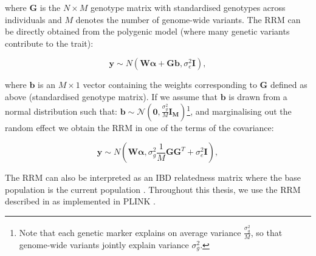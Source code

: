 where $\mathbf{G}$ is the $N \times M$ genotype matrix with standardised genotypes across individuals and $M$ denotes the number of genome-wide variants. 
The $\mathrm{RRM}$ can be directly obtained from the polygenic model (where many genetic variants contribute to the trait):

\begin{equation}\label{eq:polygenic_model}
    \mathbf{y} \sim N (\mathbf{W}\boldsymbol{\alpha} +  \mathbf{G}\mathbf{b}, \sigma_e^2\mathbf{I}),
\end{equation}

where $\mathbf{b}$ is an $M \times 1$ vector containing the weights corresponding to $\mathbf{G}$ defined as above (standardised genotype matrix).
If we assume that $\mathbf{b}$ is drawn from a normal distribution such that: $\mathbf{b} \sim \mathcal{N}(\mathbf{0}, \frac{\sigma_g^2}{M} \mathbf{I_M})$\footnote{Note that each genetic marker explains on average variance $\frac{\sigma_g^2}{M}$, so that genome-wide variants jointly explain variance $\sigma_g^2$.}, and marginalising out the random effect we obtain the RRM in one of the terms of the covariance:

\begin{equation}\label{eq:polygenic_model_MVN}
    \mathbf{y} \sim N (\mathbf{W}\boldsymbol{\alpha}, \sigma_g^2\frac{1}{M}\mathbf{G}\mathbf{G}^T + \sigma_e^2\mathbf{I} ),
\end{equation}

The $\mathrm{RRM}$ can also be interpreted as an IBD relatedness matrix where the base population
is the current population \cite{powell2010reconciling}. 
Throughout this thesis, we use the $\mathrm{RRM}$ described in \cite{yang2011gcta} as implemented in PLINK \cite{purcell2007plink}.





